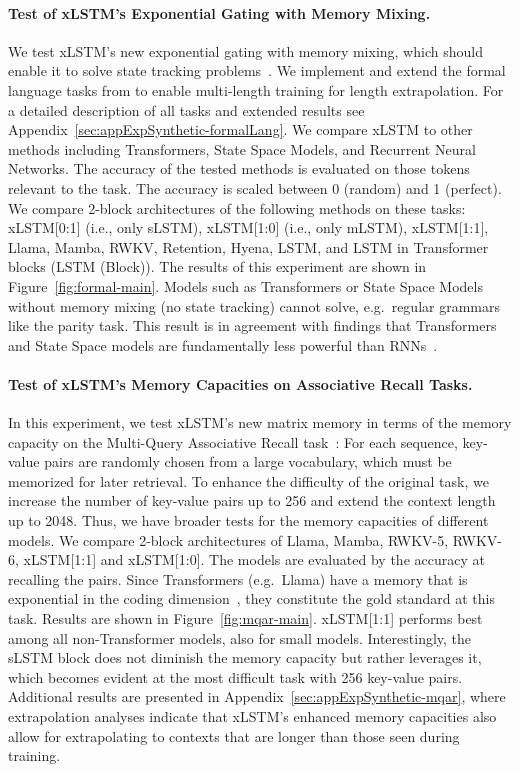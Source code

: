 \paragraph{Test of xLSTM's Exponential Gating with Memory Mixing.} We test xLSTM's new exponential gating with memory mixing, which should enable it to solve state tracking problems~\citep{Merrill:24, Merrill:23}. We implement and extend the formal language tasks from \citet{Deletang:23}
to enable multi-length training for length extrapolation. For a detailed description of all tasks and extended results see 
Appendix~\ref{sec:appExpSynthetic-formalLang}. 
We compare xLSTM to other methods including Transformers, State Space Models, and Recurrent Neural Networks. The accuracy of the tested methods is evaluated on those tokens relevant to the task. The accuracy is scaled between 0 (random) and 1 (perfect). We compare 2-block architectures of the following methods on these tasks: xLSTM[0:1] (i.e., only sLSTM), xLSTM[1:0] (i.e., only mLSTM), xLSTM[1:1], Llama, Mamba, RWKV, Retention, Hyena, LSTM, and LSTM in Transformer blocks (LSTM (Block)). The results of this experiment are shown in Figure~\ref{fig:formal-main}.
Models such as Transformers or State Space Models without memory mixing (no state tracking) cannot solve, e.g.\ regular grammars like the parity task. This result is in agreement with findings that Transformers and State Space models are fundamentally less powerful than RNNs~\citep{Merrill:24, Merrill:23, Deletang:23}. 

\paragraph{Test of xLSTM's Memory Capacities on Associative Recall Tasks.} In this experiment, we test xLSTM's new matrix memory in terms of the memory capacity on the Multi-Query Associative Recall task~\citep{Arora:23arxiv}: For each sequence, key-value pairs are randomly chosen from a large vocabulary, which must be memorized for later retrieval. To enhance the difficulty of the original task, we increase the number of key-value pairs up to 256 and extend the context length up to 2048. Thus, we have broader tests for the memory capacities of different models. We compare 2-block architectures of Llama, Mamba, RWKV-5, RWKV-6, xLSTM[1:1] and xLSTM[1:0]. The models are evaluated by the accuracy at recalling the pairs. Since Transformers (e.g.\ Llama) have a memory that is exponential in the coding dimension~\citep{Ramsauer:21}, they constitute the gold standard at this task. Results are shown in Figure~\ref{fig:mqar-main}. 
xLSTM[1:1] performs best among all non-Transformer models, also for small models. Interestingly, the sLSTM block does not diminish the memory capacity but rather leverages it, which becomes evident at the most difficult task with 256 key-value pairs. Additional results are presented in Appendix~\ref{sec:appExpSynthetic-mqar},
where extrapolation analyses indicate that xLSTM's enhanced memory capacities also allow for extrapolating to contexts that are longer than those seen during training.

